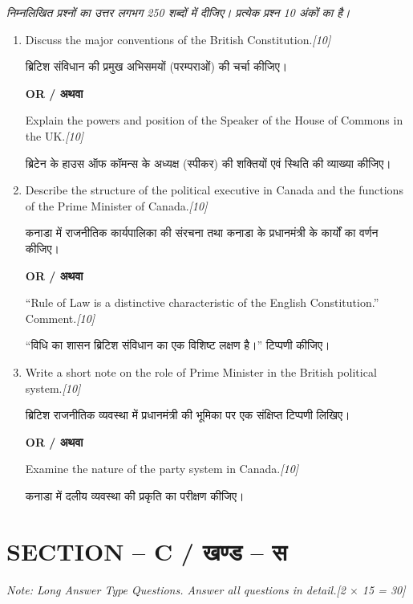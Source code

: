 \documentclass[11pt,a4paper]{article}
\newcommand{\pts}[1]{\hfill \textit{[#1]}}
\begin{document}
\noindent \textit{निम्नलिखित प्रश्नों का उत्तर लगभग 250 शब्दों में दीजिए। प्रत्येक प्रश्न 10 अंकों का है।}

\begin{enumerate}[label=\textbf{\arabic*.},leftmargin=*,start=2,itemsep=12pt]

  \item Discuss the major conventions of the British Constitution.\pts{10}
  
  ब्रिटिश संविधान की प्रमुख अभिसमयों (परम्पराओं) की चर्चा कीजिए।

  \begin{center}\textbf{OR / अथवा}\end{center}

  Explain the powers and position of the Speaker of the House of Commons in the UK.\pts{10}
  
  ब्रिटेन के हाउस ऑफ कॉमन्स के अध्यक्ष (स्पीकर) की शक्तियों एवं स्थिति की व्याख्या कीजिए।

  \item Describe the structure of the political executive in Canada and the functions of the Prime Minister of Canada.\pts{10}
  
  कनाडा में राजनीतिक कार्यपालिका की संरचना तथा कनाडा के प्रधानमंत्री के कार्यों का वर्णन कीजिए।

  \begin{center}\textbf{OR / अथवा}\end{center}

  ``Rule of Law is a distinctive characteristic of the English Constitution.'' Comment.\pts{10}
  
  ``विधि का शासन ब्रिटिश संविधान का एक विशिष्ट लक्षण है।'' टिप्पणी कीजिए।

  \item Write a short note on the role of Prime Minister in the British political system.\pts{10}
  
  ब्रिटिश राजनीतिक व्यवस्था में प्रधानमंत्री की भूमिका पर एक संक्षिप्त टिप्पणी लिखिए।

  \begin{center}\textbf{OR / अथवा}\end{center}

  Examine the nature of the party system in Canada.\pts{10}
  
  कनाडा में दलीय व्यवस्था की प्रकृति का परीक्षण कीजिए।

\end{enumerate}

\bigskip

\section*{SECTION -- C / खण्ड -- स}
\noindent \textit{Note: Long Answer Type Questions. Answer all questions in detail.}\pts{2 $\times$ 15 = 30}
\end{document}
